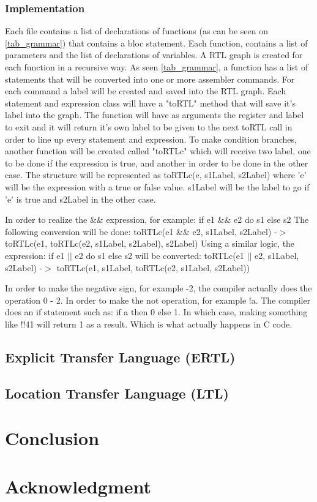 \documentclass[conference]{IEEEtran}
\begin{document}
\subsubsection{Implementation}
Each file contains a list of declarations of functions (as can be seen on \ref{tab_grammar}) that contains a bloc statement. Each function, contains a list of parameters and the list of declarations of variables.
A RTL graph is created for each function in a recursive way. As seen \ref{tab_grammar}, a function has a list of statements that will be converted into one or more assembler commands. For each command a label will be created and saved into the RTL graph. Each statement and expression class will have a "toRTL" method that will save it's label into the graph. The function will have as arguments the register and label to exit and it will return it's own label to be given to the next toRTL call in order to line up every statement and expression. 
To make condition branches, another function will be created called "toRTLc" which will receive two label, one to be done if the expression is true, and another in order to be done in the other case. The structure will be represented as toRTLc(e, s1Label, s2Label) where 'e' will be the expression with a true or false value. s1Label will be the label to go if 'e' is true and s2Label in the other case.

In order to realize the \&\& expression, for example:
if e1 \&\& e2 do s1 else s2
The following conversion will be done:
toRTLc(e1 \&\& e2, s1Label, s2Label) -$>$ toRTLc(e1, toRTLc(e2, s1Label, s2Label), s2Label)
Using a similar logic, the expression:
if e1 $|$$|$ e2 do s1 else s2
will be converted:
toRTLc(e1 $|$$|$ e2, s1Label, s2Label) -$>$ toRTLc(e1, s1Label, toRTLc(e2, s1Label, s2Label))

In order to make the negative sign, for example -2, the compiler actually does the operation 0 - 2.
In order to make the not operation, for example !a. The compiler does an if statement such as:
if a then 0 else 1. %
In which case, making something like !!41 will return 1 as a result. Which is what actually happens in C code.


\subsection{Explicit Transfer Language (ERTL)}
\subsection{Location Transfer Language (LTL)}
\section{Conclusion}

\section*{Acknowledgment}

\newpage
{}


\end{document}
